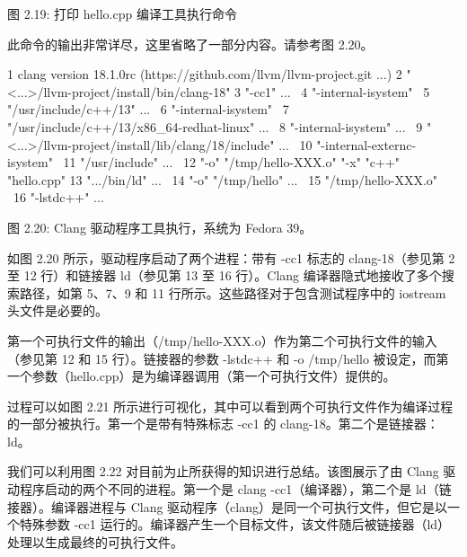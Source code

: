 \begin{center}
图 2.19: 打印 hello.cpp 编译工具执行命令
\end{center}

此命令的输出非常详尽，这里省略了一部分内容。请参考图 2.20。

\begin{shell}
1   clang version 18.1.0rc (https://github.com/llvm/llvm-project.git ...)
2   "<...>/llvm-project/install/bin/clang-18"
3     "-cc1" ... \
4     "-internal-isystem" \
5     "/usr/include/c++/13" ... \
6     "-internal-isystem" \
7     "/usr/include/c++/13/x86_64-redhat-linux" ... \
8     "-internal-isystem" ... \
9     "<...>/llvm-project/install/lib/clang/18/include" ... \
10    "-internal-externc-isystem" \
11    "/usr/include" ... \
12    "-o" "/tmp/hello-XXX.o" "-x" "c++" "hello.cpp"
13  ".../bin/ld" ... \
14    "-o" "/tmp/hello" ... \
15    "/tmp/hello-XXX.o" \
16    "-lstdc++" ...
\end{shell}

\begin{center}
图 2.20: Clang 驱动程序工具执行，系统为 Fedora 39。
\end{center}

如图 2.20 所示，驱动程序启动了两个进程：带有 -cc1 标志的 clang-18（参见第 2 至 12 行）和链接器 ld（参见第 13 至 16 行）。Clang 编译器隐式地接收了多个搜索路径，如第 5、7、9 和 11 行所示。这些路径对于包含测试程序中的 iostream 头文件是必要的。

第一个可执行文件的输出（/tmp/hello-XXX.o）作为第二个可执行文件的输入（参见第 12 和 15 行）。链接器的参数 -lstdc++ 和 -o /tmp/hello 被设定，而第一个参数（hello.cpp）是为编译器调用（第一个可执行文件）提供的。


过程可以如图 2.21 所示进行可视化，其中可以看到两个可执行文件作为编译过程的一部分被执行。第一个是带有特殊标志 -cc1 的 clang-18。第二个是链接器：ld。


我们可以利用图 2.22 对目前为止所获得的知识进行总结。该图展示了由 Clang 驱动程序启动的两个不同的进程。第一个是 clang -cc1（编译器），第二个是 ld（链接器）。编译器进程与 Clang 驱动程序（clang）是同一个可执行文件，但它是以一个特殊参数 -cc1 运行的。编译器产生一个目标文件，该文件随后被链接器（ld）处理以生成最终的可执行文件。

